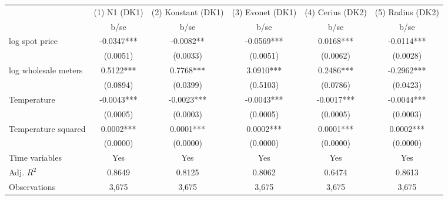 \begin{tabular}{lccccc}\toprule
                    &(1) N1 (DK1)   &(2) Konstant (DK1)   &(3) Evonet (DK1)   &(4) Cerius (DK2)   &(5) Radius (DK2)   \\
                    &        b/se   &        b/se   &        b/se   &        b/se   &        b/se   \\
\midrule
log spot price      &     -0.0347***&     -0.0082** &     -0.0569***&      0.0168***&     -0.0114***\\
                    &    (0.0051)   &    (0.0033)   &    (0.0051)   &    (0.0062)   &    (0.0028)   \\
log wholesale meters&      0.5122***&      0.7768***&      3.0910***&      0.2486***&     -0.2962***\\
                    &    (0.0894)   &    (0.0399)   &    (0.5103)   &    (0.0786)   &    (0.0423)   \\
Temperature         &     -0.0043***&     -0.0023***&     -0.0043***&     -0.0017***&     -0.0044***\\
                    &    (0.0005)   &    (0.0003)   &    (0.0005)   &    (0.0005)   &    (0.0003)   \\
Temperature squared &      0.0002***&      0.0001***&      0.0002***&      0.0001***&      0.0002***\\
                    &    (0.0000)   &    (0.0000)   &    (0.0000)   &    (0.0000)   &    (0.0000)   \\
Time variables      &         Yes   &         Yes   &         Yes   &         Yes   &         Yes   \\
\midrule
Adj. \(R^2\)        &      0.8649   &      0.8125   &      0.8062   &      0.6474   &      0.8613   \\
Observations        &       3,675   &       3,675   &       3,675   &       3,675   &       3,675   \\
\bottomrule\end{tabular}
